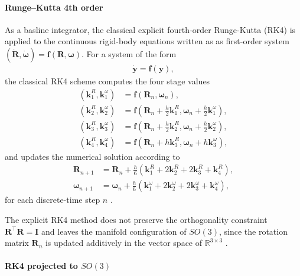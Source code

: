 \paragraph{Runge--Kutta 4th order}
As a basline integrator, the classical explicit fourth-order Runge-Kutta (RK4) is applied to the continuous rigid-body equations written as as first-order system $(\bm{\dot{R}},\bm{\dot{\omega}}) = \bm{f} (\bm{R},\bm{\omega})$. For a system of the form
\begin{align}
    \dot{\bm{y}} = \bm{f}(\bm{y}),
\end{align}
the classical RK4 scheme computes the four stage values
\begin{subequations}\label{eq:rk4_stages}
\begin{align}
    (\bm{k}_1^{R}, \bm{k}_1^{\omega}) &= \bm{f}(\bm{R}_n, \bm{\omega}_n), \\
    (\bm{k}_2^{R}, \bm{k}_2^{\omega}) &= \bm{f}\!\left(\bm{R}_n+\frac{h}{2}\bm{k}_1^{R},\bm{\omega}_n+\frac{h}{2}\bm{k}_1^{\omega}\right), \\
    (\bm{k}_3^{R}, \bm{k}_3^{\omega}) &= \bm{f}\!\left(\bm{R}_n+\frac{h}{2}\bm{k}_2^{R},\bm{\omega}_n+\frac{h}{2}\bm{k}_2^{\omega}\right), \\
   (\bm{k}_4^{R}, \bm{k}_4^{\omega}) &= \bm{f}\!\left(\bm{R}_n+h\bm{k}_3^{R}, \bm{\omega}_n+h\bm{k}_3^{\omega}\right),
\end{align}
\end{subequations}
and updates the numerical solution according to
\begin{subequations}\label{eq:rk4_update}
\begin{align}
    \bm{R}_{n+1}
    &=
    \bm{R}_n
    +
    \frac{h}{6}
    \left(
    \bm{k}_1^{R} + 2\bm{k}_2^{R} + 2\bm{k}_3^{R} + \bm{k}_4^{R}
    \right), \\
    \bm{\omega}_{n+1}
    &=
    \bm{\omega}_n
    +
    \frac{h}{6}
    \left(
    \bm{k}_1^{\omega} + 2\bm{k}_2^{\omega} + 2\bm{k}_3^{\omega} + \bm{k}_4^{\omega}
    \right),
\end{align}
\end{subequations}
for each discrete-time step $n$ \cite{butcher2016numerical}.

The explicit RK4 method does not preserve the orthogonality constraint \(\bm{R}^\top \bm{R}=\bm{I}\) and leaves the manifold configuration of $SO(3)$, since the rotation matrix $\bm{R}_n$ is updated additively in the vector space of $\mathbb{R}^{3 \times 3}$ \cite{CELLEDONI2003421}.

\paragraph{RK4 projected to $SO(3)$}

